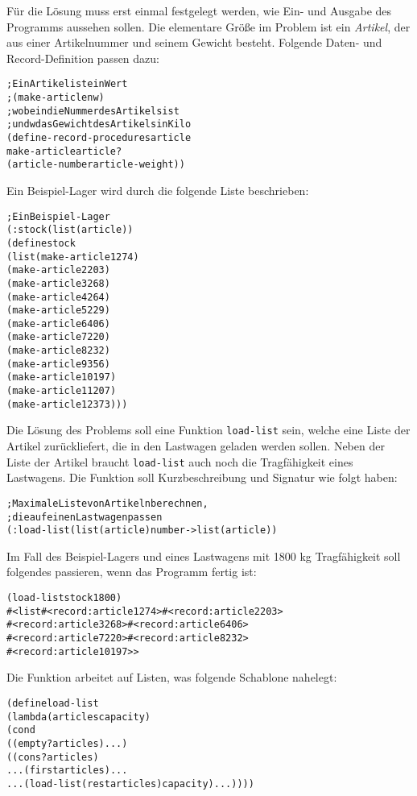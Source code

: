 Für die Lösung muss erst einmal festgelegt werden, wie Ein- und Ausgabe
des Programms aussehen sollen.  Die elementare Größe im Problem ist
ein \textit{Artikel}, der aus einer Artikelnummer und seinem Gewicht
besteht.  Folgende Daten- und Record-Definition passen dazu:
%
\begin{alltt}
; Ein Artikel ist ein Wert
;  (make-article n w)
; wobei n die Nummer des Artikels ist
; und w das Gewicht des Artikels in Kilo
(define-record-procedures article
  make-article article?
  (article-number article-weight))
\end{alltt}
%
Ein Beispiel-Lager wird durch die folgende
Liste beschrieben:
%
\begin{alltt}
; Ein Beispiel-Lager
(: stock (list(article))
(define stock
  (list (make-article 1 274)
        (make-article 2 203)
        (make-article 3 268)
        (make-article 4 264)
        (make-article 5 229)
        (make-article 6 406)
        (make-article 7 220)
        (make-article 8 232)
        (make-article 9 356)
        (make-article 10 197)
        (make-article 11 207)
        (make-article 12 373)))
\end{alltt}
%
Die Lösung des Problems soll eine Funktion \texttt{load-list}
sein, welche eine Liste der Artikel zurückliefert, die in den Lastwagen geladen
werden sollen.  Neben der Liste der Artikel braucht
\texttt{load-list} auch noch die Tragfähigkeit eines Lastwagens.  Die
Funktion soll Kurzbeschreibung und Signatur wie folgt haben:
%
\begin{alltt}
; Maximale Liste von Artikeln berechnen, 
; die auf einen Lastwagen passen
(: load-list (list(article) number -> list(article))
\end{alltt}
%
Im Fall des Beispiel-Lagers und eines Lastwagens mit 1800 kg Tragfähigkeit
soll folgendes
passieren, wenn das Programm fertig ist:
%
\begin{alltt}
(load-list stock 1800)
\evalsto{} #<list #<record:article 1 274> #<record:article 2 203>
          #<record:article 3 268> #<record:article 6 406>
          #<record:article 7 220> #<record:article 8 232> 
          #<record:article 10 197>>
\end{alltt}
%
Die Funktion arbeitet auf Listen, was folgende Schablone nahelegt:
%
\begin{alltt}
(define load-list
  (lambda (articles capacity)
    (cond
     ((empty? articles) ...)
     ((cons? articles)
      ... (first articles) ...
      ... (load-list (rest articles) capacity) ...))))
\end{alltt}
